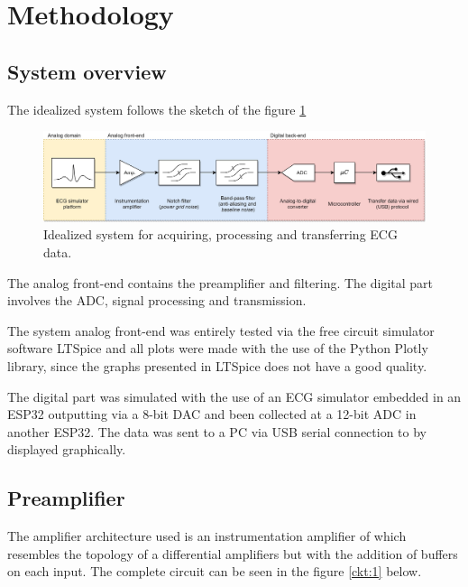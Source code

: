 \section{Methodology}

\subsection{System overview}

The idealized system follows the sketch of the figure \ref{fig:system}

\begin{figure}[h!] 

    \includegraphics[width=\textwidth,height=\textheight,keepaspectratio]{images/diagram.jpg}
    \caption{Idealized system for acquiring, processing and transferring ECG data.}
    \label{fig:system} 
\end{figure}

The analog front-end contains the preamplifier and filtering. The digital part involves the ADC, signal processing and transmission.

The system analog front-end was entirely tested via the free circuit simulator software LTSpice and all plots were made with the use of the Python Plotly library, since the graphs presented in LTSpice does not have a good quality.

The digital part was simulated with the use of an ECG simulator embedded in an ESP32 outputting via a 8-bit DAC and been collected at a 12-bit ADC in another ESP32. The data was sent to a PC via USB serial connection to by displayed graphically.

\subsection{Preamplifier}

The amplifier architecture used is an instrumentation amplifier of which resembles the topology of a differential amplifiers but with the addition of buffers on each input. The complete circuit can be seen in the figure \ref{ckt:1} below.



